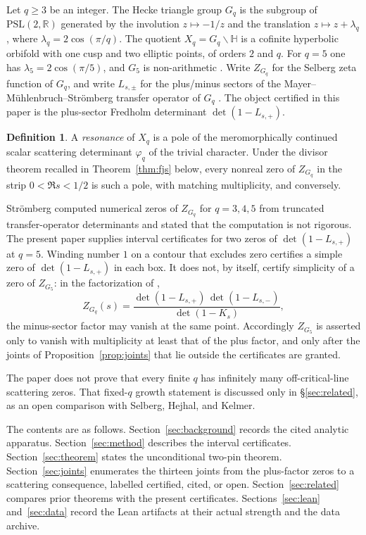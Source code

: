 \documentclass[11pt]{amsart}
\theoremstyle{definition}
\newtheorem{definition}[theorem]{Definition}
\theoremstyle{remark}
\newcommand{\Gq}{G_q}
\newcommand{\phiq}{\varphi_q}
\newcommand{\Zf}{Z_{G_5}}
\newcommand{\Zq}{Z_{G_q}}
\newcommand{\detp}{\det(1-L_{s,+})}
\begin{document}
Let $q\ge 3$ be an integer. The Hecke triangle group $\Gq$ is the
subgroup of $\mathrm{PSL}(2,\mathbb R)$ generated by the involution
$z\mapsto -1/z$ and the translation $z\mapsto z+\lambda_q$, where
$\lambda_q=2\cos(\pi/q)$. The quotient $X_q=\Gq\backslash\mathbb H$ is
a cofinite hyperbolic orbifold with one cusp and two elliptic points,
of orders $2$ and $q$. For $q=5$ one has $\lambda_5=2\cos(\pi/5)$, and
$G_5$ is non-arithmetic \cite{Takeuchi1977}. Write $\Zq$ for the
Selberg zeta function of $\Gq$, and write $L_{s,\pm}$ for the
plus/minus sectors of the Mayer--M\"uhlenbruch--Str\"omberg transfer
operator of $\Gq$ \cite{MMS2012}. The object certified in this paper
is the plus-sector Fredholm determinant $\detp$.

\begin{definition}
\label{def:resonance}
A \emph{resonance} of $X_q$ is a pole of the meromorphically continued
scalar scattering determinant $\phiq$ of the trivial character. Under
the divisor theorem recalled in Theorem~\ref{thm:fjs} below, every
nonreal zero of $\Zq$ in the strip $0<\Re s<1/2$ is such a pole, with
matching multiplicity, and conversely.
\end{definition}

Str\"omberg \cite{Stromberg2009} computed numerical zeros of
$\Zq$ for $q=3,4,5$ from truncated transfer-operator determinants and
stated that the computation is not rigorous. The present paper
supplies interval certificates for two zeros of $\detp$ at $q=5$.
Winding number $1$ on a contour that excludes zero certifies a simple
zero of $\detp$ in each box. It does not, by itself, certify
simplicity of a zero of $\Zf$: in the factorization of
\cite[Theorem 6.4]{MMS2012},
\begin{equation}
\label{eq:mms-factor}
\Zq(s)=\frac{\det(1-L_{s,+})\,\det(1-L_{s,-})}{\det(1-K_s)},
\end{equation}
the minus-sector factor may vanish at the same point. Accordingly
$\Zf$ is asserted only to vanish with multiplicity at least that of
the plus factor, and only after the joints of
Proposition~\ref{prop:joints} that lie outside the certificates are
granted.

The paper does not prove that every finite $q$ has infinitely many
off-critical-line scattering zeros. That fixed-$q$ growth statement
is discussed only in \S\ref{sec:related}, as an open comparison with
Selberg, Hejhal, and Kelmer.

The contents are as follows. Section~\ref{sec:background} records the
cited analytic apparatus. Section~\ref{sec:method} describes the
interval certificates. Section~\ref{sec:theorem} states the
unconditional two-pin theorem. Section~\ref{sec:joints} enumerates
the thirteen joints from the plus-factor zeros to a scattering
consequence, labelled certified, cited, or open.
Section~\ref{sec:related} compares prior theorems with the present
certificates. Sections~\ref{sec:lean} and~\ref{sec:data} record the
Lean artifacts at their actual strength and the data archive.
\end{document}
